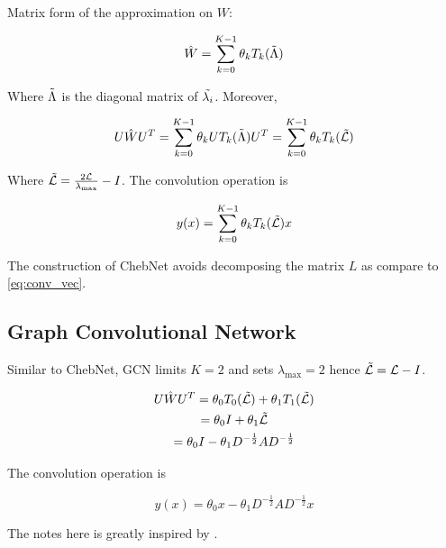 \documentclass{article}
\begin{document}
    Matrix form of the approximation on $W$:

    \begin{equation}
        \hat{W} = \sum_{k=0}^{K-1} \theta_k T_k(\Tilde{\Lambda})
    \end{equation}

    Where $\Tilde{\Lambda}$ is the diagonal matrix of $\Tilde{\lambda_i}$. Moreover,

    \begin{equation}
        U \hat{W} U^T = \sum_{k=0}^{K-1} \theta_k U T_k(\Tilde{\Lambda}) U^T = \sum_{k=0}^{K-1} \theta_k T_k(\Tilde{\mathcal{L}})
    \end{equation}

    Where $\Tilde{\mathcal{L}} = \frac{2 \mathcal{L}}{\lambda_{\max}} - I$. The convolution operation is

    \begin{equation}
        y(x) = \sum_{k=0}^{K-1} \theta_k T_k(\Tilde{\mathcal{L}}) x
    \end{equation}



    The construction of ChebNet avoids decomposing the matrix $L$ as compare to \ref{eq:conv_vec}.

    \subsection{Graph Convolutional Network}

    Similar to ChebNet, GCN \cite{kipf2016semi} limits $K = 2$ and sets $\lambda_{\max} = 2$ hence $\Tilde{\mathcal{L}} = \mathcal{L} - I$.

    \begin{gather*}
        U \hat{W} U^T = \theta_0 T_0(\Tilde{\mathcal{L}}) + \theta_1 T_1(\Tilde{\mathcal{L}}) \\
        = \theta_0 I + \theta_1 \Tilde{\mathcal{L}} \\
        = \theta_0 I - \theta_1 D^{-\frac{1}{2}} A D^{-\frac{1}{2}}
    \end{gather*}

    The convolution operation is

    \begin{equation}
        y(x) = \theta_0 x - \theta_1 D^{-\frac{1}{2}} A D^{-\frac{1}{2}} x
    \end{equation}

    The notes here is greatly inspired by \cite{chen2020note}.

    
    
\end{document}
